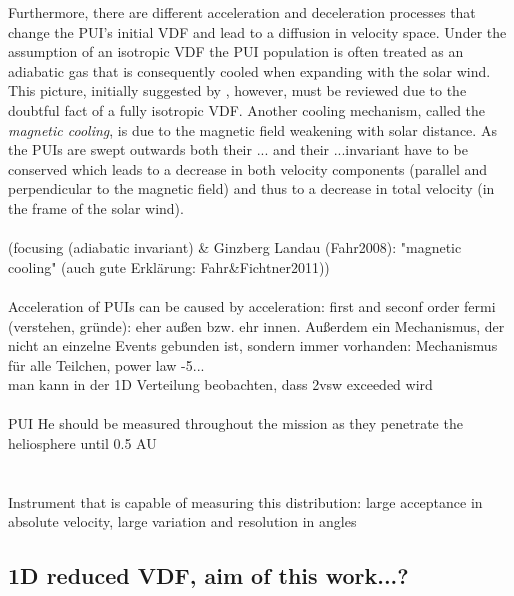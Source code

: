 Furthermore, there are different acceleration and deceleration processes that change the PUI's initial VDF and lead to a diffusion in velocity space.
Under the assumption of an isotropic VDF the PUI population is often treated as an adiabatic gas that is consequently cooled when expanding with the solar wind. This picture, initially suggested by \citet{vasyl_siscoe_1976}, however, must be reviewed due to the doubtful fact of a fully isotropic VDF.
Another cooling mechanism, called the \textit{magnetic cooling}, is due to the magnetic field weakening with solar distance. As the PUIs are swept outwards both their ... and their ...invariant have to be conserved which leads to a decrease in both velocity components (parallel and perpendicular to the magnetic field) and thus to a decrease in total velocity (in the frame of the solar wind).
\\ \\
(focusing (adiabatic invariant) \& Ginzberg Landau (Fahr2008): "magnetic cooling" (auch gute Erklärung: Fahr\&Fichtner2011))
\\ \\
Acceleration of PUIs can be caused by 
acceleration: first and seconf order fermi (verstehen, gründe): eher außen bzw. ehr innen. Außerdem ein Mechanismus, der nicht an einzelne Events gebunden ist, sondern immer vorhanden: Mechanismus für alle Teilchen, power law -5...\\
man kann in der 1D Verteilung beobachten, dass 2vsw exceeded wird
\\ \\
PUI He should be measured throughout the mission as they penetrate the heliosphere until 0.5 AU \citep{gloeckler_1992}
\\ \\ \\
Instrument that is capable of measuring this distribution: large acceptance in absolute velocity, large variation and resolution in angles
\subsection{1D reduced VDF, aim of this work...?}